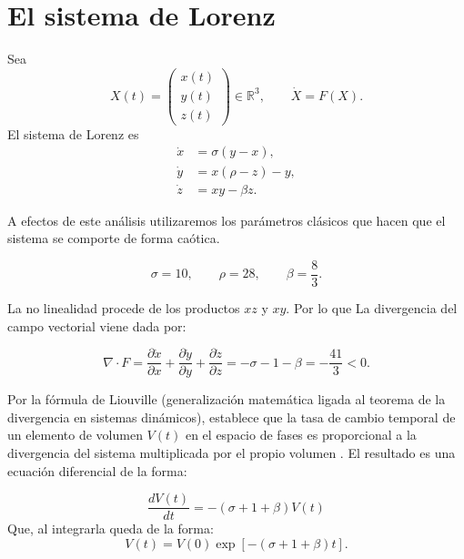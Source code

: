 \documentclass[12pt,a4paper,oneside]{report}
\theoremstyle{definition}
\numberwithin{equation}{chapter}
\newcommand{\R}{\mathbb{R}}
\begin{document}
\chapter{El sistema de Lorenz}

Sea
\[
    X(t)= \begin{pmatrix} x(t)\\y(t)\\z(t) \end{pmatrix}\in\R^3, \qquad \dot X=F(X).
\]
El sistema de Lorenz es
\begin{equation}
    \boxed{
    \begin{aligned}
        \dot x &= \sigma(y-x),\\
        \dot y &= x(\rho-z)-y,\\
        \dot z &= xy-\beta z.
    \end{aligned}}
    \label{eq:lorenz}
\end{equation}

A efectos de este análisis utilizaremos los parámetros clásicos que hacen que el sistema se comporte de forma caótica.

\begin{equation}
    \sigma=10,\qquad \rho=28,\qquad \beta=\frac83.
\end{equation}

La no linealidad procede de los productos \(xz\) y \(xy\). Por lo que La divergencia del campo vectorial viene dada por:

\begin{equation}
    \nabla\cdot F = \frac{\partial\dot x}{\partial x} +\frac{\partial\dot y}{\partial y} +\frac{\partial\dot z}{\partial z} =-\sigma-1-\beta=-\frac{41}{3}<0.
\end{equation}

Por la fórmula de Liouville  (generalización matemática ligada al teorema de la divergencia en sistemas dinámicos), establece que la tasa de cambio temporal de un elemento de volumen \(V(t)\) en el espacio de fases es proporcional a la divergencia del sistema multiplicada por el propio volumen \cite{Ehrendorfer2003}. 
El resultado es una ecuación diferencial de la forma:

\begin{equation}
    \frac{dV(t)}{dt} = -(\sigma + 1+ \beta)V(t)    
\end{equation}
Que, al integrarla queda de la forma:
\begin{equation}
    V(t)=V(0)\exp\left[-(\sigma+1+\beta)t\right].
\end{equation}
\end{document}
